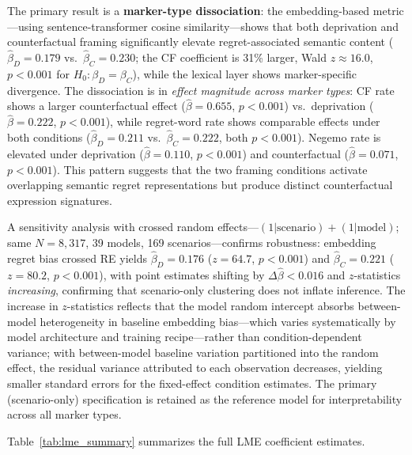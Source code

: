 \documentclass[conference,10pt]{IEEEtran}
\begin{document}
The primary result is a \textbf{marker-type dissociation}: the embedding-based metric---using sentence-transformer cosine similarity---shows that both deprivation and counterfactual framing significantly elevate regret-associated semantic content ($\hat{\beta}_D=0.179$ vs.\ $\hat{\beta}_C=0.230$; the CF coefficient is 31\% larger, Wald $z\approx16.0$, $p<0.001$ for $H_0\!:\beta_D=\beta_C$), while the lexical layer shows marker-specific divergence. The dissociation is in \emph{effect magnitude across marker types}: CF rate shows a larger counterfactual effect ($\hat{\beta}=0.655$, $p<0.001$) vs.\ deprivation ($\hat{\beta}=0.222$, $p<0.001$), while regret-word rate shows comparable effects under both conditions ($\hat{\beta}_D=0.211$ vs.\ $\hat{\beta}_C=0.222$, both $p<0.001$). Negemo rate is elevated under deprivation ($\hat{\beta}=0.110$, $p<0.001$) and counterfactual ($\hat{\beta}=0.071$, $p<0.001$). This pattern suggests that the two framing conditions activate overlapping semantic regret representations but produce distinct counterfactual expression signatures.

A sensitivity analysis with crossed random effects---$(1|\text{scenario}) + (1|\text{model})$; same $N=8{,}317$, 39 models, 169 scenarios---confirms robustness: embedding regret bias crossed RE yields $\hat{\beta}_D=0.176$ ($z=64.7$, $p<0.001$) and $\hat{\beta}_C=0.221$ ($z=80.2$, $p<0.001$), with point estimates shifting by $\Delta\hat{\beta}<0.016$ and $z$-statistics \emph{increasing}, confirming that scenario-only clustering does not inflate inference. The increase in $z$-statistics reflects that the model random intercept absorbs between-model heterogeneity in baseline embedding bias---which varies systematically by model architecture and training recipe---rather than condition-dependent variance; with between-model baseline variation partitioned into the random effect, the residual variance attributed to each observation decreases, yielding smaller standard errors for the fixed-effect condition estimates. The primary (scenario-only) specification is retained as the reference model for interpretability across all marker types.

Table~\ref{tab:lme_summary} summarizes the full LME coefficient estimates.
\end{document}
